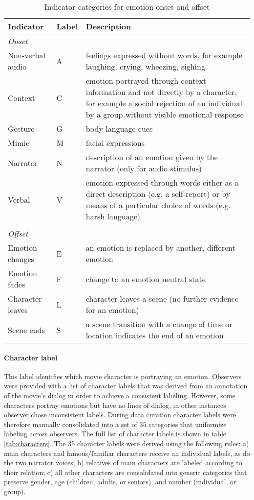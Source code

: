 \begin{table}
  \centering
  \begin{tabular}{llp{8cm}}
    Indicator & Label & Description \\
    \hline
    \textit{Onset}\\
    Non-verbal audio & A & feelings expressed without words, for example laughing, crying, wheezing, sighing\\
    Context & C & emotion portrayed through context information and not directly by a character, for example a social rejection of an individual by a group without visible emotional response\\
    Gesture & G & body language cues \\
    Mimic & M & facial expressions \\
    Narrator & N & description of an emotion given by the narrator (only for audio stimulus)\\
    Verbal & V & emotion expressed through words either as a direct description (e.g. a self-report) or by means of a particular choice of words (e.g. harsh language)\\
    \\
    \textit{Offset}\\
    Emotion changes & E & an emotion is replaced by another, different emotion \\
    Emotion fades & F & change to an emotion neutral state \\
    Character leaves & L & character leaves a scene (no further evidence for an emotion)\\
    Scene ends & S & a scene transition with a change of time or location indicates the end of an emotion\\

  \end{tabular}
  \caption{Indicator categories for emotion onset and offset}
  \label{tab:onoffset_indicators}
\end{table}

\paragraph{Character label}

This label identifies which movie character is portraying an emotion. Observers
were provided with a list of character labels that was derived from an
annotation of the movie's dialog in order to achieve a consistent labeling.
However, some characters portray emotions but have no lines of dialog, in other
instances observer chose inconsistent labels. During data curation character
labels were therefore manually consolidated into a set of 35 categories that
uniformize labeling across observers. The full list of character labels is shown in table
\ref{tab:characters}. The 35 character labels were derived using the following
rules: a) main characters and famous/familiar characters receive an individual
labels, as do the two narrator voices; b) relatives of main characters are
labeled according to their relation; c) all other characters are consolidated
into generic categories that preserve gender, age (children, adults, or seniors),
and number (individual, or group).

